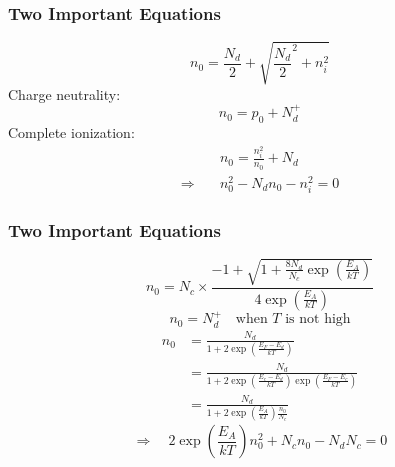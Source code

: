 \documentclass{beamer}
\begin{document}
    \begin{frame} \frametitle{Two Important Equations}
        \begin{equation*}
            \boxed{n_0 = \frac{N_d}{2} + \sqrt{\frac{N_d}{2}^2 + n_i^2 }}
        \end{equation*}
        Charge neutrality:
        \begin{equation*}
            n_0 = p_0 + N_d^+
        \end{equation*}
        Complete ionization:
        \begin{equation*}
            \begin{aligned}
                & n_0 = \frac{n_i^2}{n_0} + N_d \\
                \Rightarrow   \quad & n_0^2 - N_dn_0 - n_i^2 = 0
            \end{aligned}
        \end{equation*}
    \end{frame}
    \begin{frame} \frametitle{Two Important Equations}
        \begin{equation*}
            \boxed{n_0 = N_c \times \frac{-1 + \sqrt{1 + \frac{8N_d}{N_c} \exp\left( \frac{E_A}{kT}  \right)}}{4 \exp \left( \frac{E_A}{kT}  \right)} }
        \end{equation*}
        \begin{equation*}
            n_0 = N_d^+ \quad \text{when $T$ is not high}
        \end{equation*}
        \begin{equation*}
            \begin{aligned}
                n_0 &= \frac{N_d}{1 + 2 \exp\left( \frac{E_F - E_d}{kT}  \right)} \\
                &= \frac{N_d}{1 + 2 \exp \left( \frac{E_c - E_d}{kT}\right)  \exp\left( \frac{E_F - E_c}{kT}  \right)} \\
                &= \frac{N_d}{1 + 2 \exp\left( \frac{E_A}{kT}  \right) \frac{n_0}{N_c} } 
            \end{aligned}
        \end{equation*}
        \begin{equation*}
            \Rightarrow \quad 2 \exp\left( \frac{E_A}{kT}  \right) n_0^2 + N_c n_0 - N_d N_c = 0
        \end{equation*}
    \end{frame}
\end{document}
